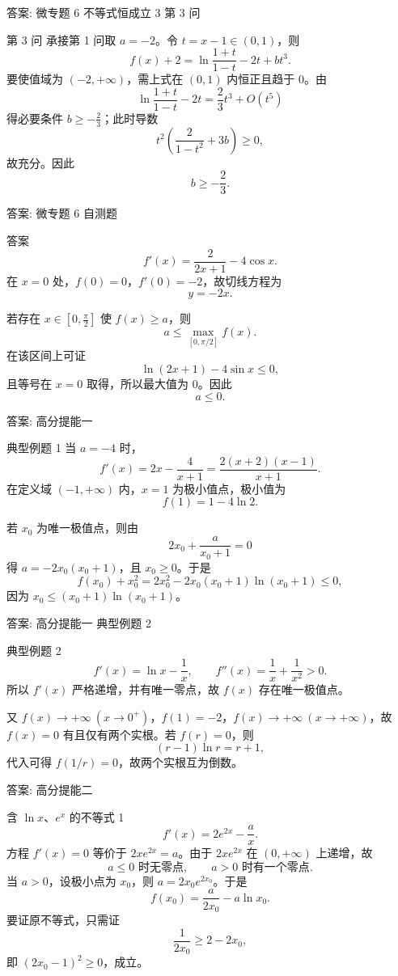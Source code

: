 ﻿\documentclass[aspectratio=169,10pt]{ctexbeamer}
\begin{document}
\begin{frame}[t]{答案: 微专题 6 不等式恒成立 3 第 3 问}
\tiny
\begin{block}{第 3 问}
承接第 1 问取 $a=-2$。令 $t=x-1\in(0,1)$，则
\[
f(x)+2=\ln\frac{1+t}{1-t}-2t+bt^3.
\]
要使值域为 $(-2,+\infty)$，需上式在 $(0,1)$ 内恒正且趋于 $0$。由
\[
\ln\frac{1+t}{1-t}-2t=\frac23t^3+O(t^5)
\]
得必要条件 $b\ge-\frac23$；此时导数
\[
t^2\left(\frac2{1-t^2}+3b\right)\ge0,
\]
故充分。因此
\[
b\ge-\frac23.
\]
\end{block}
\end{frame}

\begin{frame}[t]{答案: 微专题 6 自测题}
\tiny
\begin{block}{答案}
\[
f'(x)=\frac2{2x+1}-4\cos x.
\]
在 $x=0$ 处，$f(0)=0$，$f'(0)=-2$，故切线方程为
\[
y=-2x.
\]

若存在 $x\in\left[0,\frac{\pi}{2}\right]$ 使 $f(x)\ge a$，则
\[
a\le \max_{[0,\pi/2]} f(x).
\]
在该区间上可证
\[
\ln(2x+1)-4\sin x\le0,
\]
且等号在 $x=0$ 取得，所以最大值为 $0$。因此
\[
a\le0.
\]
\end{block}
\end{frame}

\begin{frame}[t]{答案: 高分提能一}
\tiny
\begin{block}{典型例题 1}
当 $a=-4$ 时，
\[
f'(x)=2x-\frac4{x+1}=\frac{2(x+2)(x-1)}{x+1}.
\]
在定义域 $(-1,+\infty)$ 内，$x=1$ 为极小值点，极小值为
\[
f(1)=1-4\ln2.
\]

若 $x_0$ 为唯一极值点，则由
\[
2x_0+\frac a{x_0+1}=0
\]
得 $a=-2x_0(x_0+1)$，且 $x_0\ge0$。于是
\[
f(x_0)+x_0^2=2x_0^2-2x_0(x_0+1)\ln(x_0+1)\le0,
\]
因为 $x_0\le (x_0+1)\ln(x_0+1)$。
\end{block}
\end{frame}

\begin{frame}[t]{答案: 高分提能一 典型例题 2}
\tiny
\begin{block}{典型例题 2}
\[
f'(x)=\ln x-\frac1x,\qquad f''(x)=\frac1x+\frac1{x^2}>0.
\]
所以 $f'(x)$ 严格递增，并有唯一零点，故 $f(x)$ 存在唯一极值点。

又 $f(x)\to+\infty\ (x\to0^+)$，$f(1)=-2$，$f(x)\to+\infty\ (x\to+\infty)$，故 $f(x)=0$ 有且仅有两个实根。若 $f(r)=0$，则
\[
(r-1)\ln r=r+1,
\]
代入可得 $f(1/r)=0$，故两个实根互为倒数。
\end{block}
\end{frame}

\begin{frame}[t]{答案: 高分提能二}
\tiny
\begin{block}{含 $\ln x$、$e^x$ 的不等式 1}
\[
f'(x)=2e^{2x}-\frac ax.
\]
方程 $f'(x)=0$ 等价于 $2xe^{2x}=a$。由于 $2xe^{2x}$ 在 $(0,+\infty)$ 上递增，故
\[
a\le0 \text{ 时无零点},\qquad a>0 \text{ 时有一个零点}.
\]
当 $a>0$，设极小点为 $x_0$，则 $a=2x_0e^{2x_0}$。于是
\[
f(x_0)=\frac a{2x_0}-a\ln x_0.
\]
要证原不等式，只需证
\[
\frac1{2x_0}\ge 2-2x_0,
\]
即 $(2x_0-1)^2\ge0$，成立。
\end{block}
\end{frame}
\end{document}
